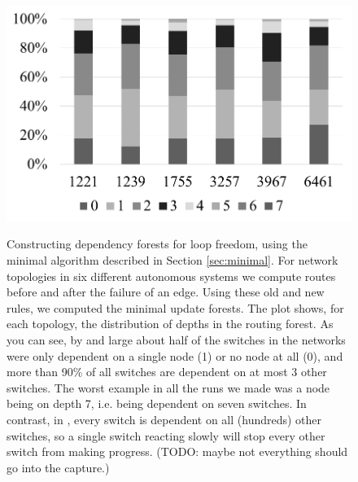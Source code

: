 \begin{figure}[t!]
  \centering
  \includegraphics[width=\columnwidth]{figures/as.png}\\
  \caption{Constructing dependency forests for loop freedom, using the minimal algorithm described in Section \ref{sec:minimal}. For network topologies in six different autonomous systems we compute routes before and after the failure of an edge. Using these old and new rules, we computed the minimal update forests. The plot shows, for each topology, the distribution of depths in the routing forest. As you can see, by and large about half of the switches in the networks were only dependent on a single node (1) or no node at all (0), and more than 90\% of all switches are dependent on at most 3 other switches. The worst example in all the runs we made was a node being on depth 7, i.e. being dependent on seven switches. In contrast, in \cite{safeupdate}, every switch is dependent on all (hundreds) other switches, so a single switch reacting slowly will stop every other switch from making progress. (TODO: maybe not everything should go into the capture.)}\label{fig:as}
\end{figure}

